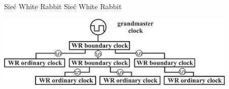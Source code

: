 \documentclass[compress,red]{beamer}
\begin{document}
\begin{frame}{Sieć White Rabbit}
\center Sieć White Rabbit
  \begin{center}
  \includegraphics[width=11.5cm]{network/wrTopology.pdf}
  \end{center}
\end{frame}
\end{document}
